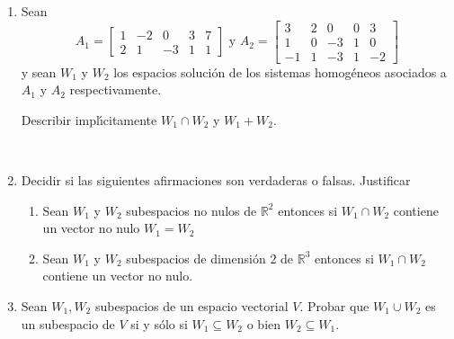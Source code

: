 \documentclass[12pt,spanish,makeidx]{amsbook}
\newcommand\R{\mathbb{R}}
\begin{document}
\begin{enumerate}
		
	\item Sean
	\[
	A_1=\begin{bmatrix}
	1&-2&0&3&7\\
	2&1&-3&1&1
	\end{bmatrix}\text { y }
	A_2=\begin{bmatrix}
	3&2&0&0&3\\
	1&0&-3&1&0 \\
	-1&1&-3&1&-2
	\end{bmatrix}
	\]
	y sean $W_1$ y $W_2$ los espacios soluci{\'o}n de los sistemas
	homog{\'e}neos asociados a $A_1$ y $A_2$ respectivamente.
	
	Describir impl{\'\i}citamente $W_1\cap W_2$ y $W_1+W_2$.
		
	\
	
	\item Decidir si las siguientes afirmaciones son verdaderas o falsas. Justificar
	\begin{enumerate}
		\item Sean $W_1$ y $W_2$ subespacios no nulos de $\R^2$ entonces si $W_1 \cap W_2$ contiene un vector no nulo $W_1 = W_2$
			\item Sean $W_1$ y $W_2$ subespacios de dimensi\'on $2$ de $\R^3$ entonces si $W_1 \cap W_2$ contiene un vector no nulo.
	\end{enumerate}
	
		
		\item Sean $W_1, W_2$ subespacios de un espacio vectorial $V$. Probar que $W_1 \cup W_2$ es un subespacio
		de $V$ si y s\'olo si $W_1 \subseteq W_2$ o bien $W_2 \subseteq W_1$.
			

	
	
	
\end{enumerate}
\end{document}
